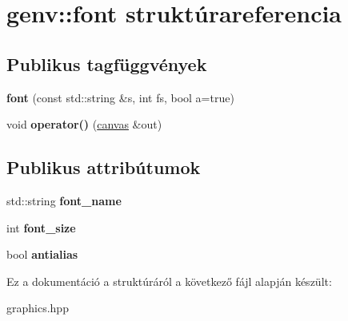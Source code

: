 \hypertarget{structgenv_1_1font}{}\section{genv\+:\+:font struktúrareferencia}
\label{structgenv_1_1font}
\subsection*{Publikus tagfüggvények}
\begin{DoxyCompactItemize}
\item 
\mbox{\label{structgenv_1_1font_adc633a2154134707b8f04cc87aa5dd01}} 
{\bfseries font} (const std\+::string \&s, int fs, bool a=true)
\item 
\mbox{\label{structgenv_1_1font_a7dc21041fb8e0903e2952910c4dfe797}} 
void {\bfseries operator()} (\hyperlink{classgenv_1_1canvas}{canvas} \&out)
\end{DoxyCompactItemize}
\subsection*{Publikus attribútumok}
\begin{DoxyCompactItemize}
\item 
\mbox{\label{structgenv_1_1font_a6bdc25d9cd31740f8d6f8797a748b893}} 
std\+::string {\bfseries font\+\_\+name}
\item 
\mbox{\label{structgenv_1_1font_a4f66de414f4f86e42881e4019b39e1ba}} 
int {\bfseries font\+\_\+size}
\item 
\mbox{\label{structgenv_1_1font_a473cdccdfaf0777e181f957354c7a782}} 
bool {\bfseries antialias}
\end{DoxyCompactItemize}


Ez a dokumentáció a struktúráról a következő fájl alapján készült\+:\begin{DoxyCompactItemize}
\item 
graphics.\+hpp\end{DoxyCompactItemize}
